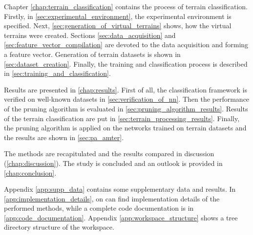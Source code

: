 Chapter \ref{chap:terrain_classification} contains the process of terrain classification. Firstly, in \cref{sec:experimental_environment}, the experimental environment is specified. Next, \cref{sec:generation_of_virtual_terrains} shows, how the virtual terrains were created. Sections \ref{sec:data_acquisition} and \ref{sec:feature_vector_compilation} are devoted to the data acquisition and forming a feature vector. Generation of terrain datasets is shown in \cref{sec:dataset_creation}. Finally, the training and classification process is described in \cref{sec:training_and_classification}.

Results are presented in \cref{chap:results}. First of all, the classification framework is verified on well-known datasets in \cref{sec:verification_of_nn}. Then the performance of the pruning algorithm is evaluated in \cref{sec:pruning_algorithm_results}. Results of the terrain classification are put in \cref{sec:terrain_processing_results}. Finally, the pruning algorithm is applied on the networks trained on terrain datasets and the results are shown in \cref{sec:pa_amter}.

The methods are recapitulated and the results compared in discussion (\cref{chap:discussion}). The study is concluded and an outlook is provided in \cref{chap:conclusion}.

Appendix \ref{app:supp_data} contains some supplementary data and results. In \cref{app:implementation_details}, on can find implementation details of the performed methods, while a complete code documentation is in \cref{app:code_documentation}. Appendix \ref{app:workspace_structure} shows a tree directory structure of the workspace.

